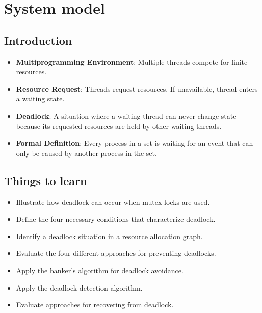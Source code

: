 \section{System model}

\subsection{Introduction}
\begin{itemize}
    \item \textbf{Multiprogramming Environment}: Multiple threads compete for finite resources.
    \item \textbf{Resource Request}: Threads request resources. If unavailable, thread enters a waiting state.
    \item \textbf{Deadlock}: A situation where a waiting thread can never change state because its requested resources are held by other waiting threads.
    \item \textbf{Formal Definition}: Every process in a set is waiting for an event that can only be caused by another process in the set.
\end{itemize}

\subsection{Things to learn}
\begin{itemize}
    \item Illustrate how deadlock can occur when mutex locks are used.
    \item Define the four necessary conditions that characterize deadlock.
    \item Identify a deadlock situation in a resource allocation graph.
    \item Evaluate the four different approaches for preventing deadlocks.
    \item Apply the banker's algorithm for deadlock avoidance.
    \item Apply the deadlock detection algorithm.
    \item Evaluate approaches for recovering from deadlock.
\end{itemize}

